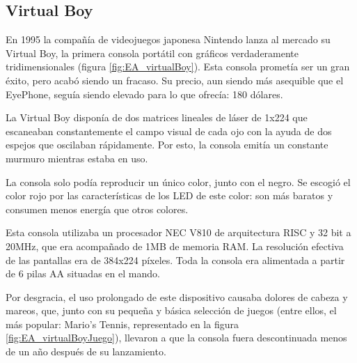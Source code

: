 \subsection{Virtual Boy}

En 1995 la compañía de videojuegos japonesa Nintendo lanza al mercado su Virtual Boy, la primera consola portátil con gráficos verdaderamente tridimensionales (figura \ref{fig:EA_virtualBoy}). Esta consola prometía ser un gran éxito, pero acabó siendo un fracaso. Su precio, aun siendo más asequible que el EyePhone, seguía siendo elevado para lo que ofrecía: 180 dólares. \cite{EA_vr_virtualboy}

La Virtual Boy disponía de dos matrices lineales de láser de 1x224 que escaneaban constantemente el campo visual de cada ojo con la ayuda de dos espejos que oscilaban rápidamente. Por esto, la consola emitía un constante murmuro mientras estaba en uso.

La consola solo podía reproducir un único color, junto con el negro. Se escogió el color rojo por las características de los LED de este color: son más baratos y consumen menos energía que otros colores.

Esta consola utilizaba un procesador NEC V810 de arquitectura RISC y 32 bit a 20MHz, que era acompañado de 1MB de memoria RAM. La resolución efectiva de las pantallas era de 384x224 píxeles. Toda la consola era alimentada a partir de 6 pilas AA situadas en el mando. \cite{EA_vr_virtualboyreview}

Por desgracia, el uso prolongado de este dispositivo causaba dolores de cabeza y mareos, que, junto con su pequeña y básica selección de juegos (entre ellos, el más popular: Mario's Tennis, representado en la figura \ref{fig:EA_virtualBoyJuego}), llevaron a que la consola fuera descontinuada menos de un año después de su lanzamiento.



